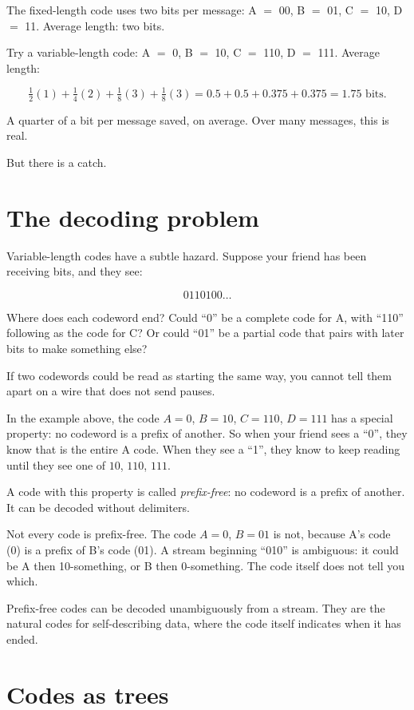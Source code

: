 The fixed-length code uses two bits per message: A $=$ 00, B $=$ 01, C $=$ 10, D $=$ 11. Average length: two bits.

Try a variable-length code: A $=$ 0, B $=$ 10, C $=$ 110, D $=$ 111. Average length:

$$\tfrac{1}{2}(1) + \tfrac{1}{4}(2) + \tfrac{1}{8}(3) + \tfrac{1}{8}(3) = 0.5 + 0.5 + 0.375 + 0.375 = 1.75 \text{ bits}.$$

A quarter of a bit per message saved, on average. Over many messages, this is real.

But there is a catch.

\section*{The decoding problem}

Variable-length codes have a subtle hazard. Suppose your friend has been receiving bits, and they see:

$$0110100\ldots$$

Where does each codeword end? Could ``0'' be a complete code for A, with ``110'' following as the code for C? Or could ``01'' be a partial code that pairs with later bits to make something else?

If two codewords could be read as starting the same way, you cannot tell them apart on a wire that does not send pauses.

In the example above, the code $A=0$, $B=10$, $C=110$, $D=111$ has a special property: no codeword is a prefix of another. So when your friend sees a ``0'', they know that is the entire A code. When they see a ``1'', they know to keep reading until they see one of $10$, $110$, $111$.

A code with this property is called \emph{prefix-free}: no codeword is a prefix of another. It can be decoded without delimiters.

Not every code is prefix-free. The code $A=0$, $B=01$ is not, because A's code (0) is a prefix of B's code (01). A stream beginning ``010'' is ambiguous: it could be A then 10-something, or B then 0-something. The code itself does not tell you which.

Prefix-free codes can be decoded unambiguously from a stream. They are the natural codes for self-describing data, where the code itself indicates when it has ended.

\section*{Codes as trees}

